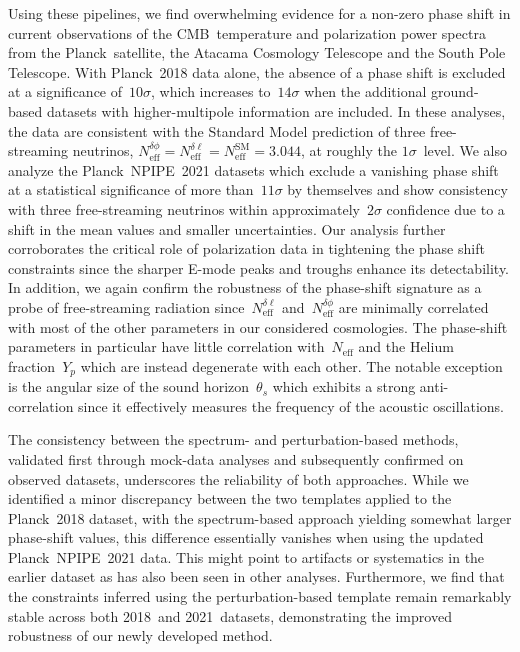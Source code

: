 \documentclass[11pt]{article}
\numberwithin{equation}{section}
\newcommand{\Neff}{N_\mathrm{eff}}
\newcommand{\Nphase}{N_\mathrm{eff}^{\delta\phi}}
\newcommand{\Nmultipole}{N_\mathrm{eff}^{\delta\ell}}
\begin{document}
Using these pipelines, we find overwhelming evidence for a non-zero phase shift in current observations of the CMB~temperature and polarization power spectra from the Planck~satellite, the Atacama Cosmology Telescope and the South Pole Telescope. With Planck~2018 data alone, the absence of a phase shift is excluded at a significance of~$10\sigma$, which increases to~$14\sigma$ when the additional ground-based datasets with higher-multipole information are included. In these analyses, the data are consistent with the Standard Model prediction of three free-streaming neutrinos, $\Nphase = \Nmultipole = \Neff^\mathrm{SM} = 3.044$, at roughly the $1\sigma$~level. We also analyze the Planck~NPIPE~2021 datasets which exclude a vanishing phase shift at a statistical significance of more than~$11\sigma$ by themselves and show consistency with three free-streaming neutrinos within approximately~$2\sigma$ confidence due to a shift in the mean values and smaller uncertainties. Our analysis further corroborates the critical role of polarization data in tightening the phase shift constraints since the sharper E-mode peaks and troughs enhance its detectability. In addition, we again confirm the robustness of the phase-shift signature as a probe of free-streaming radiation since~$\Nmultipole$ and~$\Nphase$ are minimally correlated with most of the other parameters in our considered cosmologies. The phase-shift parameters in particular have little correlation with~$\Neff$ and the Helium fraction~$Y_p$ which are instead degenerate with each other. The notable exception is the angular size of the sound horizon~$\theta_s$ which exhibits a strong anti-correlation since it effectively measures the frequency of the acoustic oscillations.

The consistency between the spectrum- and perturbation-based methods, validated first through mock-data analyses and subsequently confirmed on observed datasets, underscores the reliability of both approaches. While we identified a minor discrepancy between the two templates applied to the Planck~2018 dataset, with the spectrum-based approach yielding somewhat larger phase-shift values, this difference essentially vanishes when using the updated Planck~NPIPE~2021 data. This might point to artifacts or systematics in the earlier dataset as has also been seen in other analyses. Furthermore, we find that the constraints inferred using the perturbation-based template remain remarkably stable across both 2018~and 2021~datasets, demonstrating the improved robustness of our newly developed method.
\end{document}
